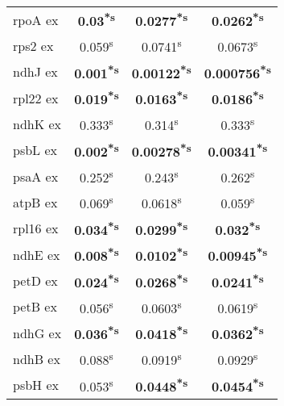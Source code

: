 \documentclass[a4paper]{article}
\begin{document}
\begin{longtable}{l|c|c|c}
rpoA ex&\textbf{0.03\textsuperscript{*}\textsuperscript{s}}&\textbf{0.0277\textsuperscript{*}\textsuperscript{s}}&\textbf{0.0262\textsuperscript{*}\textsuperscript{s}}\\
rps2 ex&0.059\textsuperscript{s}&0.0741\textsuperscript{s}&0.0673\textsuperscript{s}\\
ndhJ ex&\textbf{0.001\textsuperscript{*}\textsuperscript{s}}&\textbf{0.00122\textsuperscript{*}\textsuperscript{s}}&\textbf{0.000756\textsuperscript{*}\textsuperscript{s}}\\
rpl22 ex&\textbf{0.019\textsuperscript{*}\textsuperscript{s}}&\textbf{0.0163\textsuperscript{*}\textsuperscript{s}}&\textbf{0.0186\textsuperscript{*}\textsuperscript{s}}\\
ndhK ex&0.333\textsuperscript{s}&0.314\textsuperscript{s}&0.333\textsuperscript{s}\\
psbL ex&\textbf{0.002\textsuperscript{*}\textsuperscript{s}}&\textbf{0.00278\textsuperscript{*}\textsuperscript{s}}&\textbf{0.00341\textsuperscript{*}\textsuperscript{s}}\\
psaA ex&0.252\textsuperscript{s}&0.243\textsuperscript{s}&0.262\textsuperscript{s}\\
atpB ex&0.069\textsuperscript{s}&0.0618\textsuperscript{s}&0.059\textsuperscript{s}\\
rpl16 ex&\textbf{0.034\textsuperscript{*}\textsuperscript{s}}&\textbf{0.0299\textsuperscript{*}\textsuperscript{s}}&\textbf{0.032\textsuperscript{*}\textsuperscript{s}}\\
ndhE ex&\textbf{0.008\textsuperscript{*}\textsuperscript{s}}&\textbf{0.0102\textsuperscript{*}\textsuperscript{s}}&\textbf{0.00945\textsuperscript{*}\textsuperscript{s}}\\
petD ex&\textbf{0.024\textsuperscript{*}\textsuperscript{s}}&\textbf{0.0268\textsuperscript{*}\textsuperscript{s}}&\textbf{0.0241\textsuperscript{*}\textsuperscript{s}}\\
petB ex&0.056\textsuperscript{s}&0.0603\textsuperscript{s}&0.0619\textsuperscript{s}\\
ndhG ex&\textbf{0.036\textsuperscript{*}\textsuperscript{s}}&\textbf{0.0418\textsuperscript{*}\textsuperscript{s}}&\textbf{0.0362\textsuperscript{*}\textsuperscript{s}}\\
ndhB ex&0.088\textsuperscript{s}&0.0919\textsuperscript{s}&0.0929\textsuperscript{s}\\
psbH ex&0.053\textsuperscript{s}&\textbf{0.0448\textsuperscript{*}\textsuperscript{s}}&\textbf{0.0454\textsuperscript{*}\textsuperscript{s}}\\

\end{longtable}
\end{document}
